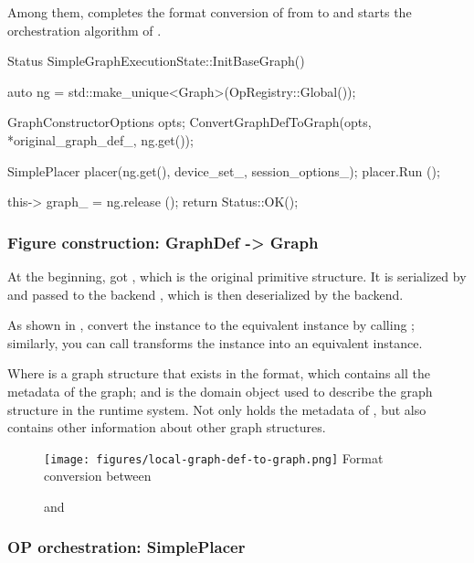 \begin{content}
Among them,  completes the format conversion of  from  to  and starts the  orchestration algorithm of .

\begin{leftbar}
\begin{c++}
Status SimpleGraphExecutionState::InitBaseGraph() {
  auto ng = std::make_unique<Graph>(OpRegistry::Global());

  GraphConstructorOptions opts;
  ConvertGraphDefToGraph(opts, *original_graph_def_, ng.get());

  SimplePlacer placer(ng.get(), device_set_, session_options_);
  placer.Run ();

  this-> graph_ = ng.release ();
  return Status::OK();
}
\end{c++}
\end{leftbar}

\subsubsection{Figure construction: GraphDef -> Graph}

At the beginning,  got , which is the original primitive structure. It is serialized by  and passed to the backend , which is then deserialized by the backend.

As shown in , convert the  instance to the equivalent  instance by calling ; similarly, you can call  transforms the  instance into an equivalent  instance.

Where  is a graph structure that exists in the  format, which contains all the metadata of the graph; and  is the domain object used to describe the graph structure in the runtime system. Not only holds the metadata of , but also contains other information about other graph structures.

\begin{figure}[H]
\centering
\texttt{[image: figures/local-graph-def-to-graph.png]}
Format conversion between \caption{ and }
 \label{fig:local-graph-def-to-graph}
\end{figure}

\subsubsection{OP orchestration: SimplePlacer}


\end{content}
